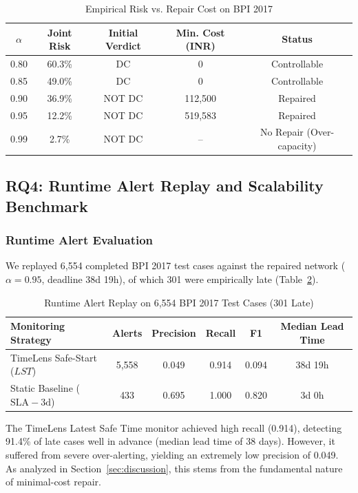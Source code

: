 \documentclass[conference]{IEEEtran}
\begin{document}
\begin{table}[h]
\centering
\caption{Empirical Risk vs. Repair Cost on BPI 2017}
\label{tab:frontier_data}
\begin{tabular}{ccccc}
\toprule
$\alpha$ & \textbf{Joint Risk} & \textbf{Initial Verdict} & \textbf{Min. Cost (INR)} & \textbf{Status} \\
\midrule
0.80 & 60.3\% & DC & 0 & Controllable \\
0.85 & 49.0\% & DC & 0 & Controllable \\
0.90 & 36.9\% & NOT DC & 112,500 & Repaired \\
0.95 & 12.2\% & NOT DC & 519,583 & Repaired \\
0.99 & 2.7\% & NOT DC & -- & No Repair (Over-capacity) \\
\bottomrule
\end{tabular}
\end{table}

\subsection{RQ4: Runtime Alert Replay and Scalability Benchmark}

\subsubsection{Runtime Alert Evaluation}
We replayed 6,554 completed BPI 2017 test cases against the repaired network ($\alpha = 0.95$, deadline 38d 19h), of which 301 were empirically late (Table~\ref{tab:alert_results}).

\begin{table}[h]
\centering
\caption{Runtime Alert Replay on 6,554 BPI 2017 Test Cases (301 Late)}
\label{tab:alert_results}
\begin{tabular}{lccccc}
\toprule
\textbf{Monitoring Strategy} & \textbf{Alerts} & \textbf{Precision} & \textbf{Recall} & \textbf{F1} & \textbf{Median Lead Time} \\
\midrule
TimeLens Safe-Start ($LST$) & 5,558 & 0.049 & 0.914 & 0.094 & 38d 19h \\
Static Baseline ($\text{SLA} - 3\text{d}$) & 433 & 0.695 & 1.000 & 0.820 & 3d 0h \\
\bottomrule
\end{tabular}
\end{table}

The TimeLens Latest Safe Time monitor achieved high recall (0.914), detecting 91.4\% of late cases well in advance (median lead time of 38 days). However, it suffered from severe over-alerting, yielding an extremely low precision of 0.049. As analyzed in Section~\ref{sec:discussion}, this stems from the fundamental nature of minimal-cost repair.
\end{document}
